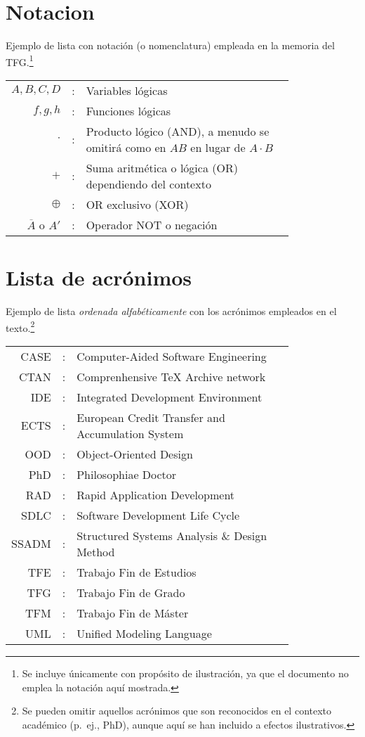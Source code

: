\section*{Notacion}
Ejemplo de lista con notación (o nomenclatura) empleada en la memoria del TFG.\footnote{Se incluye únicamente con propósito de ilustración, ya que el documento no emplea la notación aquí mostrada.}

\begin{tabular}{r r p{0.8\linewidth}}
$A, B, C, D$	& : & Variables lógicas \\
$f, g, h$		& :	& Funciones lógicas \\
$\cdot$			& : & Producto lógico (AND), a menudo se omitirá como en $A 
B$ en lugar de $A \cdot B$\\
$+$				& : & Suma aritmética o lógica (OR) dependiendo del 
contexto\\
$\oplus$		& : & OR exclusivo (XOR)\\
$\overline{A}$ o ${A}'$	& : & Operador NOT o negación
\end{tabular}

\section*{Lista de acrónimos}
Ejemplo de lista \emph{ordenada alfabéticamente} con los acrónimos empleados en el texto.\footnote{Se pueden omitir aquellos acrónimos que son reconocidos en el contexto académico (p.~ej., PhD), aunque aquí se han incluido a efectos ilustrativos.}

\begin{tabular}{r r p{0.8\linewidth}}
CASE& : &Computer-Aided Software Engineering \\
CTAN& : &Comprenhensive \TeX{} Archive network \\
IDE& : &Integrated Development Environment \\
ECTS& : &European Credit Transfer and Accumulation System \\
OOD& : &Object-Oriented Design \\
PhD& : &Philosophiae Doctor \\
RAD& : &Rapid Application Development \\
SDLC& : &Software Development Life Cycle \\
SSADM& : &Structured Systems Analysis \& Design Method \\
TFE& : &Trabajo Fin de Estudios \\
TFG& : &Trabajo Fin de Grado \\
TFM& : &Trabajo Fin de Máster \\
UML& : &Unified Modeling Language
\end{tabular}

\idxGral
\idxFiguras
\idxTablas
\idxListados
\idxAlgoritmos


